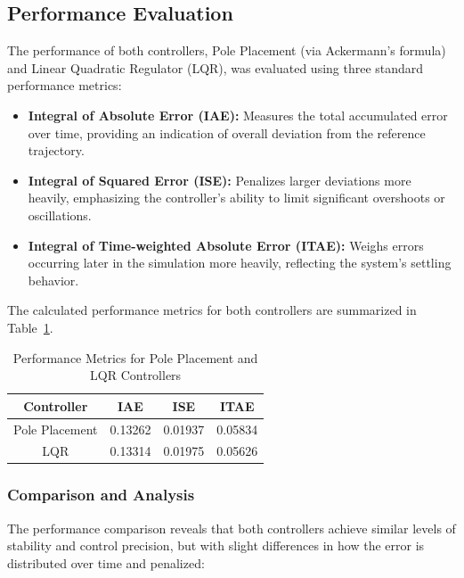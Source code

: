 \documentclass[conference]{IEEEtran}
\begin{document}
\subsection{Performance Evaluation}
\label{subsec:control_performance}
The performance of both controllers, Pole Placement (via Ackermann's formula) and Linear Quadratic Regulator (LQR), was evaluated using three standard performance metrics:

\begin{itemize}
    \item \textbf{Integral of Absolute Error (IAE):} Measures the total accumulated error over time, providing an indication of overall deviation from the reference trajectory.
    \item \textbf{Integral of Squared Error (ISE):} Penalizes larger deviations more heavily, emphasizing the controller's ability to limit significant overshoots or oscillations.
    \item \textbf{Integral of Time-weighted Absolute Error (ITAE):} Weighs errors occurring later in the simulation more heavily, reflecting the system's settling behavior.
\end{itemize}

The calculated performance metrics for both controllers are summarized in Table~\ref{tab:performance_metrics}.

\begin{table}[H]
\centering
\caption{Performance Metrics for Pole Placement and LQR Controllers}
\label{tab:performance_metrics}
\begin{tabular}{|c|c|c|c|}
\hline
\textbf{Controller} & \textbf{IAE}   & \textbf{ISE}   & \textbf{ITAE}  \\ \hline
Pole Placement      & 0.13262        & 0.01937        & 0.05834        \\ \hline
LQR                 & 0.13314        & 0.01975        & 0.05626        \\ \hline
\end{tabular}
\end{table}

\subsubsection{Comparison and Analysis}
The performance comparison reveals that both controllers achieve similar levels of stability and control precision, but with slight differences in how the error is distributed over time and penalized:
\end{document}
